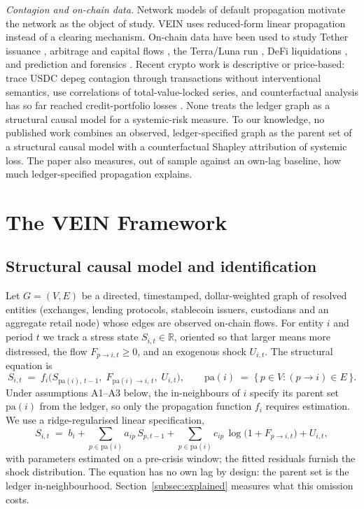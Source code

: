 \documentclass[referee,pdflatex,sn-mathphys-ay]{sn-jnl}
\theoremstyle{thmstyleone}%
\theoremstyle{thmstyletwo}%
\theoremstyle{thmstylethree}%
\newcommand{\pa}{\mathrm{pa}}
\begin{document}
\emph{Contagion and on-chain data.} Network models of default propagation
\citep{eisenberg2001systemic,acemoglu2015systemic,glasserman2016contagion} motivate the
network as the object of study. VEIN uses reduced-form linear propagation instead of a
clearing mechanism. On-chain data have been used to study Tether issuance \citep{griffin2020bitcoin}, arbitrage
and capital flows \citep{makarov2020trading}, the Terra/Luna run \citep{liu2023anatomy},
DeFi liquidations \citep{qin2021liquidations}, and prediction and forensics
\citep{akcora2018bitcoin,meiklejohn2013fistful,weber2019antimoney}. Recent crypto work is descriptive or price-based:
\citet{sankaewtong2026tracing} trace USDC depeg contagion through transactions without interventional semantics,
\citet{zhang2026defi} use correlations of total-value-locked series, and counterfactual analysis has so far reached
credit-portfolio losses \citep{xu2025counterfactual}. None treats the ledger graph as a structural causal model for a
systemic-risk measure. To our knowledge, no published work combines an observed, ledger-specified graph as the parent set of a
structural causal model with a counterfactual Shapley attribution of systemic loss. The paper also measures, out of
sample against an own-lag baseline, how much ledger-specified propagation explains.

\section{The VEIN Framework}
\label{sec:method}

\subsection{Structural causal model and identification}
\label{subsec:scm}
Let $G=(V,E)$ be a directed, timestamped, dollar-weighted graph of resolved entities
(exchanges, lending protocols, stablecoin issuers, custodians and an aggregate retail node)
whose edges are observed on-chain flows. For entity $i$ and period $t$ we track a stress
state $S_{i,t}\in\mathbb{R}$, oriented so that larger means more distressed, the flow
$F_{p\to i,t}\ge0$, and an exogenous shock $U_{i,t}$. The structural equation is
\begin{equation}
\label{eq:scm}
S_{i,t} \;=\; f_i\!\Big(S_{\pa(i),\,t-1},\; F_{\pa(i)\to i,\,t},\; U_{i,t}\Big),
\qquad
\pa(i) \;=\; \{\,p\in V : (p\to i)\in E\,\}.
\end{equation}
Under assumptions A1--A3 below, the in-neighbours of $i$ specify its parent set $\pa(i)$
from the ledger, so only the propagation function $f_i$ requires estimation. We use a
ridge-regularised linear specification,
\begin{equation}
\label{eq:fi}
S_{i,t} \;=\; b_i + \sum_{p\in\pa(i)} a_{ip}\,S_{p,t-1}
            + \sum_{p\in\pa(i)} c_{ip}\,\log\!\big(1+F_{p\to i,t}\big)
            + U_{i,t},
\end{equation}
with parameters estimated on a pre-crisis window; the fitted residuals furnish the shock
distribution. The equation has no own lag by design: the parent set is the ledger in-neighbourhood.
Section~\ref{subsec:explained} measures what this omission costs.
\end{document}
